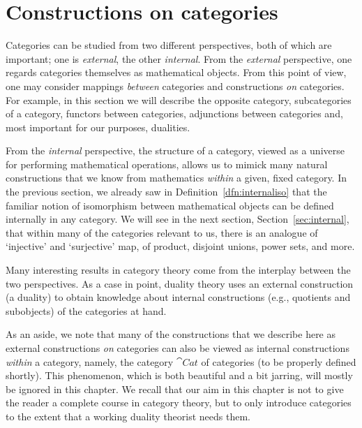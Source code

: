 \section{Constructions on categories}\label{sec:external}
Categories can be studied from two different perspectives, both of which are important; one is \emph{external}, the other \emph{internal}. %
From the \emph{external} perspective, one regards categories themselves as mathematical objects. From this point of view, one may consider mappings \emph{between} categories and constructions \emph{on} categories. For example, in this section we will describe the opposite category, subcategories of a category, functors between categories, adjunctions between categories and, most important for our purposes, dualities. %

From the \emph{internal} perspective, the structure of a category, viewed as a universe for performing mathematical operations, allows us to mimick many natural constructions that we know from mathematics \emph{within} a given, fixed category. In the previous section, we already saw in Definition~\ref{dfn:internaliso} that the familiar notion of isomorphism between mathematical objects can be defined internally in any category. We will see in the next section, Section~\ref{sec:internal}, that within many of the categories relevant to us, there is an analogue of `injective' and `surjective' map, of product, disjoint unions, power sets, and more. 

Many interesting results in category theory come from the interplay between the two perspectives. As a case in point, duality theory uses an external construction (a duality) to obtain knowledge about internal constructions (e.g., quotients and subobjects) of the categories at hand.

As an aside, we note that many of the constructions that we describe here as
external constructions \emph{on} categories can also be viewed as internal
constructions \emph{within} a category, namely, the category $\cat{Cat}$ of
categories (to be properly defined shortly). This phenomenon, which is both
beautiful and a bit jarring, will mostly be ignored in this chapter. 
We recall that our aim in this chapter is not to give the reader a complete
course in category theory, but to only introduce categories to the extent that a
working duality theorist needs them.




